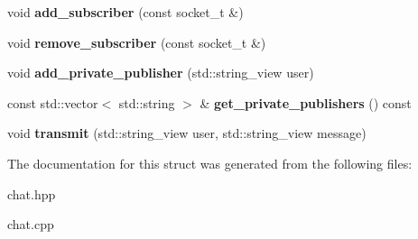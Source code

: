 \begin{DoxyCompactItemize}
void {\bfseries add\+\_\+subscriber} (const socket\+\_\+t \&)
\item 
\mbox{\label{structmods_1_1chat_1_1channel_a1bb7012ae6ce2ceef032579c53131391}} 
void {\bfseries remove\+\_\+subscriber} (const socket\+\_\+t \&)
\item 
\mbox{\label{structmods_1_1chat_1_1channel_ac28759a007ddf0062f0bafaa9e935258}} 
void {\bfseries add\+\_\+private\+\_\+publisher} (std\+::string\+\_\+view user)
\item 
\mbox{\label{structmods_1_1chat_1_1channel_ae8aa7434c82740e713e8afbd8e6616de}} 
const std\+::vector$<$ std\+::string $>$ \& {\bfseries get\+\_\+private\+\_\+publishers} () const
\item 
\mbox{\label{structmods_1_1chat_1_1channel_a920d7de90019b46f459b08c4d2b13dea}} 
void {\bfseries transmit} (std\+::string\+\_\+view user, std\+::string\+\_\+view message)
\end{DoxyCompactItemize}


The documentation for this struct was generated from the following files\+:\begin{DoxyCompactItemize}
\item 
chat.\+hpp\item 
chat.\+cpp\end{DoxyCompactItemize}

